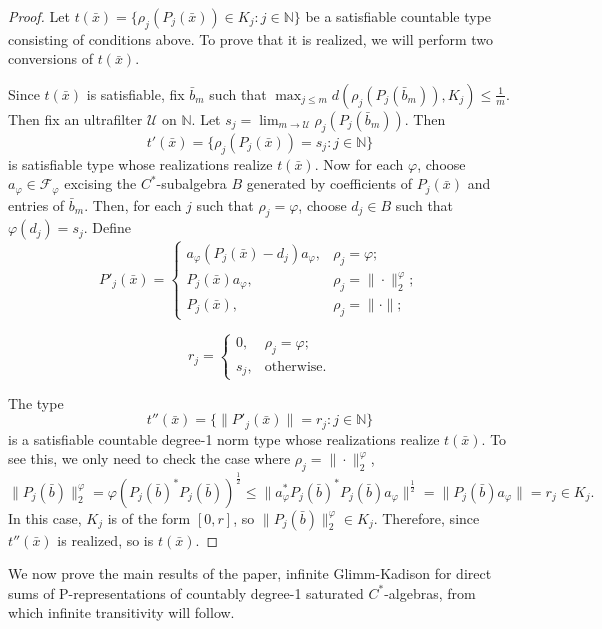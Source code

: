 \documentclass[10pt]{amsart}
\theoremstyle{definition}
\newcommand{\Fp}{\mathscr{F}_\varphi}
\newcommand{\U}{\mathscr{U}}
\begin{document}
\begin{proof}
    Let $t(\bar{x})=\{\rho_j(P_j(\bar{x}))\in K_j:j\in\mathbb{N}\}$ be a satisfiable countable type consisting of conditions above. To prove that it is realized, we will perform two conversions of $t(\bar{x})$.
    
    Since $t(\bar{x})$ is satisfiable, fix $\bar{b}_m$ such that $\max_{j\leq m}d(\rho_j(P_j(\bar{b}_m)),K_j)\leq\frac{1}{m}$. Then fix an ultrafilter $\U$ on $\mathbb{N}$. Let $s_j=\lim_{m\rightarrow\U}\rho_j(P_j(\bar{b}_m))$. Then
    \[t'(\bar{x})=\{\rho_j(P_j(\bar{x}))=s_j:j\in\mathbb{N}\}\]
    is satisfiable type whose realizations realize $t(\bar{x})$. Now for each $\varphi$, choose $a_\varphi\in\Fp$ excising the $C^*$-subalgebra $B$ generated by coefficients of $P_j(\bar{x})$ and entries of $\bar{b}_m$. Then, for each $j$ such that $\rho_j=\varphi$, choose $d_j\in B$ such that $\varphi(d_j)=s_j$. Define
    \[P'_j(\bar{x}) = \begin{cases} 
        a_\varphi(P_j(\bar{x})-d_j)a_\varphi, & \rho_j=\varphi; \\
        P_j(\bar{x})a_\varphi, & \rho_j=\|\cdot\|_2^\varphi; \\
        P_j(\bar{x}), & \rho_j=\|\cdot\|;
   \end{cases}\]

   \[r_j = \begin{cases} 
        0, & \rho_j=\varphi; \\
        s_j, & \text{otherwise}.
   \end{cases}\]
   
   The type
   \[t''(\bar{x})=\{\|P'_j(\bar{x})\|=r_j:j\in\mathbb{N}\}\]
   is a satisfiable countable degree-1 norm type whose realizations realize $t(\bar{x})$. To see this, we only need to check the case where $\rho_j=\|\cdot\|_2^\varphi$,
   \[\|P_j(\bar{b})\|_2^\varphi=\varphi(P_j(\bar{b})^*P_j(\bar{b}))^\frac{1}{2}\leq\|a_\varphi^*P_j(\bar{b})^*P_j(\bar{b})a_\varphi\|^\frac{1}{2}=\|P_j(\bar{b})a_\varphi\|=r_j\in K_j.\]
   In this case, $K_j$ is of the form $[0,r]$, so $\|P_j(\bar{b})\|^\varphi_2\in K_j$.
   Therefore, since $t''(\bar{x})$ is realized, so is $t(\bar{x})$.
\end{proof}

We now prove the main results of the paper, infinite Glimm-Kadison for direct sums of P-representations of countably degree-1 saturated $C^*$-algebras, from which infinite transitivity will follow.
\end{document}
